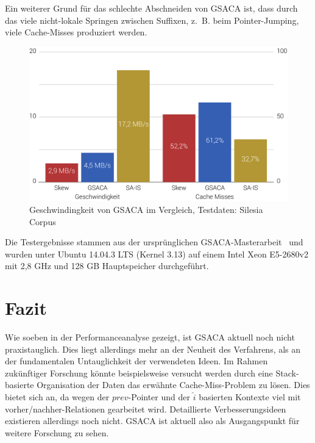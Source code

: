 \documentclass[twoside,a4paper,11pt]{article}
\theoremstyle{break}
\begin{document}
Ein weiterer Grund für das schlechte Abschneiden von GSACA ist, dass durch das viele nicht-lokale Springen zwischen Suffixen, z.~B. beim Pointer-Jumping, viele Cache-Misses produziert werden.

\begin{figure}[H]
	\centering
	\includegraphics[width=0.7\linewidth,bb=0 0 830 495]{./assets/performance.pdf}
	\caption{Geschwindingkeit von GSACA im Vergleich, Testdaten: Silesia Corpus~\cite{silesiaCorpus}}
\label{fig:performance}
\end{figure}

Die Testergebnisse stammen aus der ursprünglichen GSACA-Masterarbeit~\cite{baierThesis} und wurden unter Ubuntu 14.04.3 LTS (Kernel 3.13) auf einem Intel Xeon E5-2680v2 mit 2,8 GHz und 128 GB Hauptspeicher durchgeführt.

\section{Fazit}

Wie soeben in der Performanceanalyse gezeigt, ist GSACA aktuell noch nicht praxistauglich. Dies liegt allerdings mehr an der Neuheit des Verfahrens, als an der fundamentalen Untauglichkeit der verwendeten Ideen. Im Rahmen zukünftiger Forschung könnte beispielsweise versucht werden durch eine Stack-basierte Organisation der Daten das erwähnte Cache-Miss-Problem zu lösen. Dies bietet sich an, da wegen der $prev$-Pointer und der $\widehat{i}$ basierten Kontexte viel mit vorher/nachher-Relationen gearbeitet wird. Detaillierte Verbesserungsideen existieren allerdings noch nicht. GSACA ist aktuell also als Ausgangspunkt für weitere Forschung zu sehen.



\end{document}
